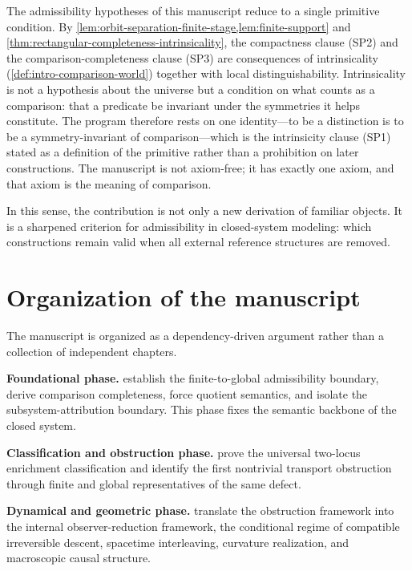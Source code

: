 The admissibility hypotheses of this manuscript reduce to a single
primitive condition. By
\cref{lem:orbit-separation-finite-stage,lem:finite-support} and
\cref{thm:rectangular-completeness-intrinsicality}, the compactness
clause \textup{(SP2)} and the comparison-completeness clause
\textup{(SP3)} are consequences of intrinsicality
(\cref{def:intro-comparison-world}) together with local
distinguishability. Intrinsicality is not a hypothesis about the universe
but a condition on what counts as a comparison: that a predicate be
invariant under the symmetries it helps constitute. The program therefore
rests on one identity---to be a distinction is to be a
symmetry-invariant of comparison---which is the intrinsicity clause
\textup{(SP1)} stated as a definition of the primitive rather than a
prohibition on later constructions. The manuscript is not axiom-free; it
has exactly one axiom, and that axiom is the meaning of comparison.

In this sense, the contribution is not only a new derivation of familiar
objects.
It is a sharpened criterion for admissibility in closed-system modeling:
which constructions remain valid when all external reference structures
are removed.

\section{Organization of the manuscript}
\label{sec:paper}
The manuscript is organized as a dependency-driven argument rather than a
collection of independent chapters.

\textbf{Foundational phase.}
 establish the
finite-to-global admissibility boundary, derive comparison completeness,
force quotient semantics, and isolate the subsystem-attribution boundary.
This phase fixes the semantic backbone of the closed system.

\textbf{Classification and obstruction phase.}
prove the universal two-locus enrichment classification and identify the
first nontrivial transport obstruction through finite and global
representatives of the same defect.

\textbf{Dynamical and geometric phase.}
translate the obstruction framework into the internal
observer-reduction framework, the conditional regime of compatible
irreversible descent, spacetime interleaving, curvature realization,
and macroscopic causal structure.

